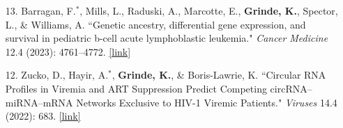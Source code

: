 \documentclass[margin]{res}
\newcommand{\annotateItem}[1]{
	\begin{itemize} \vspace{-0.1cm}
	\item[] 
	\begin{footnotesize}\textcolor{black}{(#1)}\end{footnotesize}
	\end{itemize} \vspace{-0.1cm}
}
\begin{document}
\begin{resume}
\begin{itemize}
\item[13.] Barragan, F.$^*$, Mills, L., Raduski, A., Marcotte, E., \textbf{Grinde, K.}, Spector, L., \& Williams, A. ``Genetic ancestry, differential gene expression, and survival in pediatric b-cell acute lymphoblastic leukemia." \textit{Cancer Medicine} 12.4 (2023): 4761--4772.
\href{https://onlinelibrary.wiley.com/doi/full/10.1002/cam4.5266}{[link]}


\item[12.] Zucko, D., Hayir, A.$^*$,  \textbf{Grinde, K.}, \& Boris-Lawrie, K. ``Circular RNA Profiles in Viremia and ART Suppression Predict Competing circRNA– miRNA–mRNA Networks Exclusive to HIV-1 Viremic Patients." \textit{Viruses} 14.4 (2022): 683. 
\href{https://www.mdpi.com/1999-4915/14/4/683}{[link]}


\end{itemize}
\end{resume}
\end{document}
